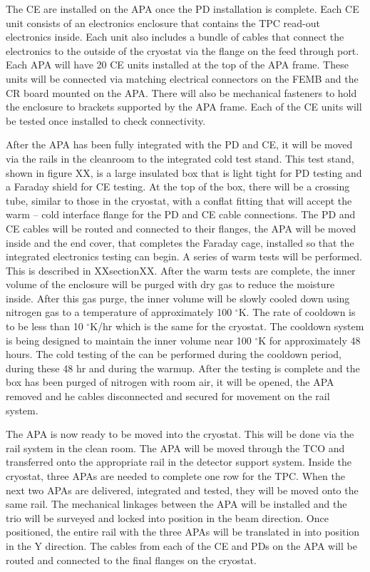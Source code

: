 The CE are installed on the APA once the PD installation is complete.  Each CE unit consists of an electronics enclosure that contains the TPC read-out electronics inside.  Each unit also includes a bundle of cables that connect the electronics to the outside of the cryostat via the flange on the feed through port.  Each APA will have 20 CE units installed at the top of the APA frame.  These units will be connected via matching electrical connectors on the FEMB and the CR board mounted on the APA.  There will also be mechanical fasteners to hold the enclosure to brackets supported by the APA frame.  Each of the CE units will be tested once installed to check connectivity.  

After the APA has been fully integrated with the PD and CE, it will be moved via the rails in the cleanroom to the integrated cold test stand.  This test stand, shown in figure XX, \fixme{}is a large insulated box that is light tight for PD testing and a Faraday shield for CE testing.  At the top of the box, there will be a crossing tube, similar to those in the cryostat, with a conflat fitting that will accept the warm – cold interface flange for the PD and CE cable connections.  The PD and CE cables will be routed and connected to their flanges, the APA will be moved inside and the end cover, that completes the Faraday cage, installed so that the integrated electronics testing can begin.  A series of warm tests will be performed.  This is described in XXsectionXX.  \fixme{}
After the warm tests are complete, the inner volume of the enclosure will be purged with dry gas to reduce the moisture inside.  After this gas purge, the inner volume will be slowly cooled down using nitrogen gas to a temperature of approximately 100 $^\circ$K.  The rate of cooldown is to be less than 10 $^\circ$K/hr which is the same for the cryostat.  The cooldown system is being designed to maintain the inner volume near 100 $^\circ$K for approximately 48 hours.  The cold testing of the can be performed during the cooldown period, during these 48 hr and during the warmup.  After the testing is complete and the box has been purged of nitrogen with room air, it will be opened, the APA removed and he cables disconnected and secured for movement on the rail system.   

The APA is now ready to be moved into the cryostat.  This will be done via the rail system in the clean room.  The APA will be moved through the TCO and transferred onto the appropriate rail in the detector support system.  Inside the cryostat, three APAs are needed to complete one row for the TPC.  When the next two APAs are delivered, integrated and tested, they will be moved onto the same rail.  The mechanical linkages between the APA will be installed and the trio will be surveyed and locked into position in the beam direction.  Once positioned, the entire rail with the three APAs will be translated in into position in the Y direction.  The cables from each of the CE and PDs on the APA will be routed and connected to the final flanges on the cryostat.  

